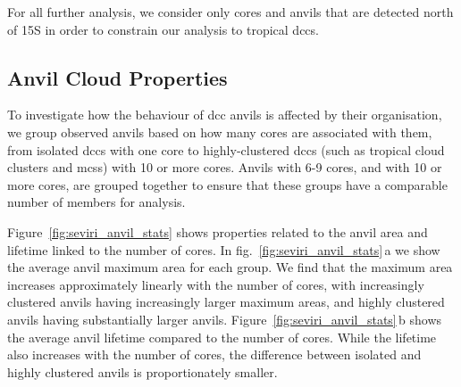 For all further analysis, we consider only cores and anvils that are
detected north of 15\textdegree S in order to constrain our analysis to tropical
\acrshort{dcc}s.

\subsection{Anvil Cloud Properties}

To investigate how the behaviour of \acrshort{dcc} anvils is affected by their
organisation, we group observed anvils based on how many cores are
associated with them, from isolated \acrshort{dcc}s with one core to
highly-clustered \acrshort{dcc}s (such as tropical cloud clusters and \acrshort{mcs}s) with 10
or more cores. Anvils with 6-9 cores, and with 10 or more cores, are
grouped together to ensure that these groups have a comparable number of
members for analysis.

Figure~\ref{fig:seviri_anvil_stats} shows properties related to the anvil area and lifetime linked
to the number of cores. In fig.~\ref{fig:seviri_anvil_stats}\,a we show the average anvil maximum
area for each group. We find that the maximum area increases
approximately linearly with the number of cores, with increasingly
clustered anvils having increasingly larger maximum areas, and highly
clustered anvils having substantially larger anvils. Figure~\ref{fig:seviri_anvil_stats}\,b shows
the average anvil lifetime compared to the number of cores. While the
lifetime also increases with the number of cores, the difference between
isolated and highly clustered anvils is proportionately smaller.


